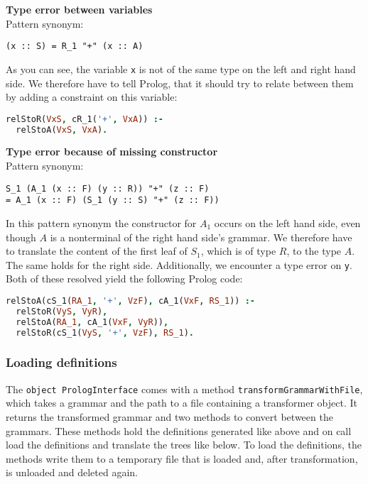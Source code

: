 \documentclass[a4paper]{article}
\begin{document}
{\bfseries Type error between variables}\\
Pattern synonym:
\begin{lstlisting}[language=transformer]
 (x :: S) = R_1 "+" (x :: A)
\end{lstlisting}
As you can see, the variable \verb|x| is not of the same type on the left and right hand side. We therefore have to tell Prolog, that it should try to relate between them by adding a constraint on this variable:
\begin{lstlisting}[language=Prolog]
relStoR(VxS, cR_1('+', VxA)) :-
  relStoA(VxS, VxA).
\end{lstlisting}

{\bfseries Type error because of missing constructor}\\%
Pattern synonym:
\begin{lstlisting}[language=transformer]
  S_1 (A_1 (x :: F) (y :: R)) "+" (z :: F) 
= A_1 (x :: F) (S_1 (y :: S) "+" (z :: F))
\end{lstlisting}
In this pattern synonym the constructor for $A_1$ occurs on the left hand side, even though $A$ is a nonterminal of the right hand side's grammar. We therefore have to translate the content of the first leaf of $S_1$, which is of type $R$, to the type $A$. The same holds for the right side. Additionally, we encounter a type error on \verb|y|. Both of these resolved yield the following Prolog code:
\begin{lstlisting}[language=Prolog]
relStoA(cS_1(RA_1, '+', VzF), cA_1(VxF, RS_1)) :-
  relStoR(VyS, VyR),
  relStoA(RA_1, cA_1(VxF, VyR)),
  relStoR(cS_1(VyS, '+', VzF), RS_1).
\end{lstlisting}

\subsubsection{Loading definitions}
The \lstinline{object PrologInterface} comes with a method \lstinline{transformGrammarWithFile}, which takes a grammar and the path to a file containing a transformer object. It returns the transformed grammar and two methods to convert between the grammars. These methods hold the definitions generated like above and on call load the definitions and translate the trees like below. To load the definitions, the methods write them to a temporary file that is loaded and, after transformation, is unloaded and deleted again.
\end{document}
